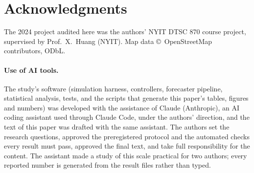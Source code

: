 \documentclass[11pt]{article}
\begin{document}
\section*{Acknowledgments}
The 2024 project audited here was the authors' NYIT DTSC 870 course project, supervised by Prof.\ X.\ Huang
(NYIT). Map data \copyright\ OpenStreetMap contributors, ODbL.

\paragraph{Use of AI tools.} The study's software (simulation harness, controllers, forecaster pipeline, statistical
analysis, tests, and the scripts that generate this paper's tables, figures and numbers) was developed with the
assistance of Claude (Anthropic), an AI coding assistant used through Claude Code, under the authors' direction, and
the text of this paper was drafted with the same assistant. The authors set the research questions, approved the
preregistered protocol and the automated checks every result must pass, approved the final text, and take full
responsibility for the content. The assistant made a study of this scale practical for two authors; every reported
number is generated from the result files rather than typed.



\end{document}
